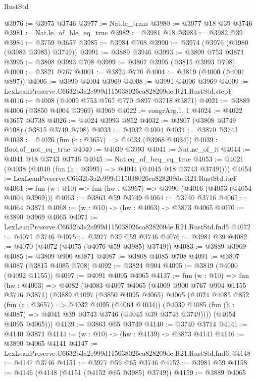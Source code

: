 \begin{lexlean}{RustStd}
\begin{coremodule}
@3976 := @3975 @3746
@3977 := Nat.le_trans
@3980 := @3977 @18 @39 @3746
@3981 := Nat.le_of_ble_eq_true
@3982 := @3981 @18
@3983 := @3982 @39
@3984 := @3759 @3657
@3985 := @3984 @708
@3990 := @3974 (@3976 (@3980 (@3983 @3985) @3749))
@3991 := @3889 @3946
@3993 := @3809 @753 @3871
@3995 := @3808 @3993 @708
@3999 := @3807 @3995 (@3815 @3993 @708)
@4000 := @3821 @767
@4001 := @3824 @770
@4004 := @3819 (@4000 (@4001 @897))
@4006 := @3999 @4004 @3969
@4008 := @3991 @4006 @3969
@4009 := LexLeanPreserve.C6632b3a2e999d115038026ca828209de.R21.RustStd.stepF
@4016 := @4008 (@4009 @753 @767 @770 @897 @3718 @3871)
@4021 := @3889 @4006 (@3850 @4004 @3969) @3969
@4022 := congrArg.{1, 1}
@4024 := @4022 @3657 @3738
@4026 := @4024 @3993 @852
@4032 := @3807 (@3808 @3749 @708) (@3815 @3749 @708)
@4033 := @4032 @4004
@4034 := @3870 @3743
@4038 := @4026 (fun (c : @3657) => @4033 (@3968 @4034))
@4039 := Bool.of_not_eq_true
@4040 := @4039 @3993
@4041 := Nat.ne_of_lt
@4044 := @4041 @18 @3743 @3746
@4045 := Nat.eq_of_beq_eq_true
@4053 := @4021 (@4038 (@4040 (fun (h : @3995) => @4044 (@4045 @18 @3743 @3749))))
@4054 := LexLeanPreserve.C6632b3a2e999d115038026ca828209de.R21.RustStd.iteF
@4061 := fun (w : @10) => fun (hw : @3967) => @3990 (@4016 (@4053 (@4054 @4004 @3969)))
@4063 := @3863 @59 @3749
@4064 := @3740 @3716
@4065 := @4064 @3871
@4068 := (w : @10) -> (hw : @4063) -> @3873 @4065
@4070 := @3890 @3969 @4065
@4071 := LexLeanPreserve.C6632b3a2e999d115038026ca828209de.R21.RustStd.fnd5
@4072 := @4071 @3746
@4075 := @3977 @39 @59 @3746
@4076 := @3981 @39
@4082 := @4070 (@4072 (@4075 (@4076 @59 @3985) @3749))
@4083 := @3889 @3969
@4085 := @3809 @900 @3871
@4087 := @3808 @4085 @708
@4091 := @3807 @4087 (@3815 @4085 @708)
@4092 := @3824 @904
@4095 := @3819 (@4000 (@4092 @1155))
@4097 := @4091 @4095 @4065
@4137 := fun (w : @10) =>
  fun (hw : @4063) =>
  @4082
    (@4083
      @4097
      @4065
      (@4009 @900 @767 @904 @1155 @3716 @3871)
      (@3889
        @4097
        (@3850 @4095 @4065)
        @4065
        (@4024
          @4085
          @852
          (fun (c : @3657) => @4032 @4095 (@4064 @4034))
          (@4039 @4085 (fun (h : @4087) => @4041 @39 @3743 @3746 (@4045 @39 @3743 @3749))))
        (@4054 @4095 @4065)))
@4139 := @3863 @65 @3749
@4140 := @3740 @3714
@4141 := @4140 @3871
@4144 := (w : @10) -> (hw : @4139) -> @3873 @4141
@4146 := @3890 @4065 @4141
@4147 := LexLeanPreserve.C6632b3a2e999d115038026ca828209de.R21.RustStd.fnd6
@4148 := @4147 @3746
@4151 := @3977 @59 @65 @3746
@4152 := @3981 @59
@4158 := @4146 (@4148 (@4151 (@4152 @65 @3985) @3749))
@4159 := @3889 @4065

\end{coremodule}
\end{lexlean}
